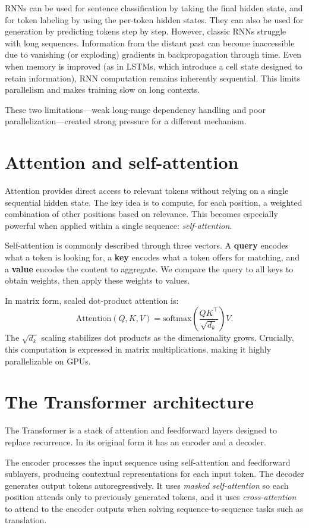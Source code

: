 RNNs can be used for sentence classification by taking the final hidden state, and for token labeling by using the per-token hidden states. They can also be used for generation by predicting tokens step by step. However, classic RNNs struggle with long sequences. Information from the distant past can become inaccessible due to vanishing (or exploding) gradients in backpropagation through time. Even when memory is improved (as in LSTMs, which introduce a cell state designed to retain information), RNN computation remains inherently sequential. This limits parallelism and makes training slow on long contexts.

These two limitations—weak long-range dependency handling and poor parallelization—created strong pressure for a different mechanism.

\section{Attention and self-attention}
Attention provides direct access to relevant tokens without relying on a single sequential hidden state. The key idea is to compute, for each position, a weighted combination of other positions based on relevance. This becomes especially powerful when applied within a single sequence: \emph{self-attention}.

Self-attention is commonly described through three vectors. A \textbf{query} encodes what a token is looking for, a \textbf{key} encodes what a token offers for matching, and a \textbf{value} encodes the content to aggregate. We compare the query to all keys to obtain weights, then apply these weights to values.

In matrix form, scaled dot-product attention is:
\[
\mathrm{Attention}(Q,K,V)=\mathrm{softmax}\!\left(\frac{QK^\top}{\sqrt{d_k}}\right)V.
\]
The $\sqrt{d_k}$ scaling stabilizes dot products as the dimensionality grows. Crucially, this computation is expressed in matrix multiplications, making it highly parallelizable on GPUs.

\section{The Transformer architecture}
The Transformer is a stack of attention and feedforward layers designed to replace recurrence. In its original form it has an encoder and a decoder.

The encoder processes the input sequence using self-attention and feedforward sublayers, producing contextual representations for each input token. The decoder generates output tokens autoregressively. It uses \emph{masked self-attention} so each position attends only to previously generated tokens, and it uses \emph{cross-attention} to attend to the encoder outputs when solving sequence-to-sequence tasks such as translation.

